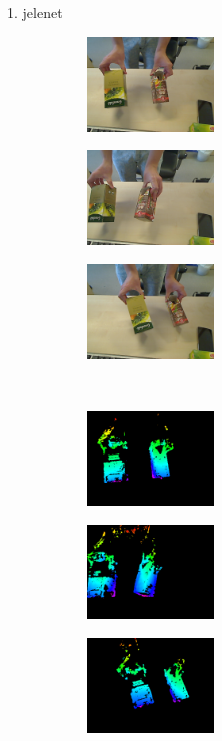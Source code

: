 \begin{frame}{1. jelenet}
\begin{figure}
\begin{subfigure}[b]{.32\linewidth}
	\centering
	\includegraphics[width=95pt]{figures/left_93.png}
  \end{subfigure}
\begin{subfigure}[b]{.32\linewidth}
	\centering
	\includegraphics[width=95pt]{figures/left_153.png}
  \end{subfigure}
\begin{subfigure}[b]{.32\linewidth}
	\centering
	\includegraphics[width=95pt]{figures/left_223.png}
  \end{subfigure}\\\vspace{5pt}
\begin{subfigure}[b]{.32\linewidth}
	\centering
	\includegraphics[width=95pt]{figures/vis_93.png}
  \end{subfigure}
\begin{subfigure}[b]{.32\linewidth}
	\centering
	\includegraphics[width=95pt]{figures/vis_153.png}
  \end{subfigure}
\begin{subfigure}[b]{.32\linewidth}
	\centering
	\includegraphics[width=95pt]{figures/vis_223.png}
  \end{subfigure}
  
\end{figure}

\end{frame}

